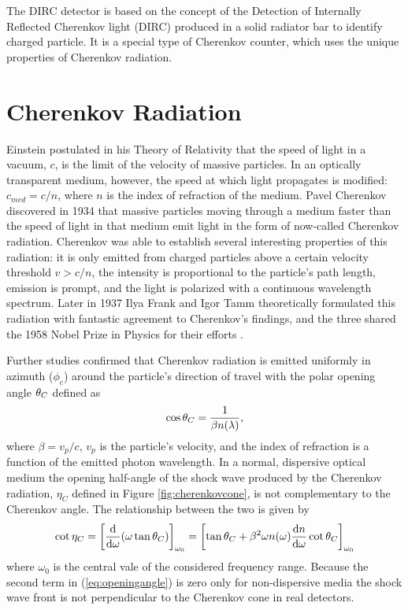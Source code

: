 The DIRC detector is based on the concept of the Detection of Internally Reflected Cherenkov light (DIRC) produced in a solid radiator bar to identify charged particle. It is a special type of Cherenkov counter, which uses the unique properties of Cherenkov radiation.

\section{Cherenkov Radiation}
Einstein postulated in his Theory of Relativity that the speed of light in a vacuum, $c$, is the limit of the velocity of massive particles. In an optically transparent medium, however, the speed at which light propagates is modified: $c_{med} = c/n$, where $n$ is the index of refraction of the medium. Pavel Cherenkov discovered in 1934 that massive particles moving through a medium faster than the speed of light in that medium emit light in the form of now-called Cherenkov radiation. Cherenkov was able to establish several interesting properties of this radiation: it is only emitted from charged particles above a certain velocity threshold $v > c/n$, the intensity is proportional to the particle's path length, emission is prompt, and the light is polarized with a continuous wavelength spectrum. Later in 1937 Ilya Frank and Igor Tamm theoretically formulated this radiation with fantastic agreement to Cherenkov's findings, and the three shared the 1958 Nobel Prize in Physics for their efforts \cite{CherenkovHistory}.

Further studies confirmed that Cherenkov radiation is emitted uniformly in azimuth ($\phi_c$) around the particle's direction of travel with the polar opening angle $\theta_{C}$ defined as
\begin{equation}
	\cos\theta_{C} = \frac{1}{\beta n(\lambda)},
	\label{eq:cherenkovformula}
\end{equation}
where $\beta = v_p/c$, $v_p$ is the particle's velocity, and the index of refraction is a function of the emitted photon wavelength. In a normal, dispersive optical medium the opening half-angle of the shock wave produced by the Cherenkov radiation, $\eta_C$ defined in Figure \ref{fig:cherenkovcone}, is not complementary to the Cherenkov angle. The relationship between the two is given by
\begin{equation}
	\cot\eta_C = \left[\frac{\mathrm{d}}{\mathrm{d}\omega}(\omega \tan\theta_{C}) \right]_{\omega_0} = \left[\tan\theta_{C} + \beta^2\omega n(\omega) \frac{\mathrm{d} n}{\mathrm{d}\omega}\cot\theta_{C} \right]_{\omega_0}
	\label{eq:openingangle}
\end{equation}
where $\omega_0$ is the central vale of the considered frequency range. Because the second term in (\ref{eq:openingangle}) is zero only for non-dispersive media the shock wave front is not perpendicular to the Cherenkov cone in real detectors.

